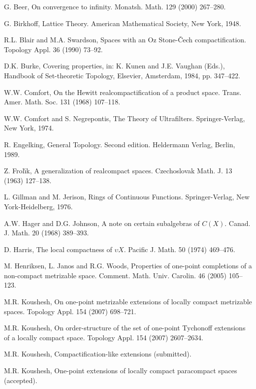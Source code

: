\documentclass{amsart}
\theoremstyle{definition}
\theoremstyle{remark}
\theoremstyle{notation}
\numberwithin{equation}{section}
\begin{document}
\begin{thebibliography}{10}

 G. Beer, On convergence to infinity. Monatsh. Math. 129 (2000) 267--280.

 G. Birkhoff, Lattice Theory. American Mathematical Society, New York, 1948.

 R.L. Blair and M.A. Swardson,  Spaces with an Oz Stone-\v{C}ech  compactification. Topology Appl. 36 (1990) 73--92.

 D.K. Burke, Covering properties, in: K. Kunen and J.E. Vaughan (Eds.), Handbook of Set-theoretic Topology,  Elsevier,  Amsterdam, 1984, pp. 347--422.

 W.W. Comfort, On the Hewitt realcompactification of a product space. Trans. Amer. Math. Soc. 131 (1968) 107--118.

 W.W. Comfort and S. Negrepontis, The Theory of Ultrafilters. Springer-Verlag, New York, 1974.

 R. Engelking, General Topology. Second edition. Heldermann Verlag, Berlin, 1989.

 Z. Frol\'{\i}k, A generalization of realcompact spaces. Czechoslovak Math. J. 13 (1963) 127--138.

 L. Gillman and M. Jerison, Rings of Continuous Functions.  Springer-Verlag, New York-Heidelberg, 1976.

 A.W. Hager and D.G.  Johnson, A note on certain subalgebras of $C(X)$. Canad. J. Math. 20 (1968) 389--393.

 D. Harris, The local compactness of $\upsilon X$. Pacific J. Math. 50 (1974) 469--476.

 M. Henriksen, L. Janos and R.G. Woods, Properties of one-point completions of a non-compact metrizable space. Comment. Math. Univ. Carolin. 46 (2005) 105--123.

 M.R. Koushesh, On one-point metrizable extensions of locally compact metrizable spaces. Topology Appl. 154 (2007) 698--721.

 M.R. Koushesh, On order-structure of the set of one-point Tychonoff extensions of a locally compact space. Topology Appl. 154 (2007) 2607--2634.

 M.R. Koushesh, Compactification-like extensions (submitted).

 M.R. Koushesh, One-point extensions of locally compact paracompact spaces (accepted).


\end{thebibliography}
\end{document}
